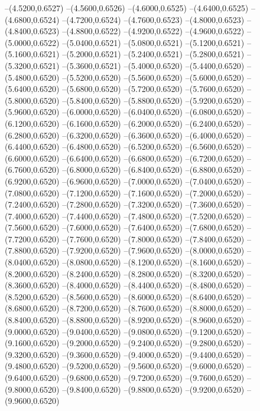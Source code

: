 {	--(4.5200,0.6527)
	--(4.5600,0.6526)
	--(4.6000,0.6525)
	--(4.6400,0.6525)
	--(4.6800,0.6524)
	--(4.7200,0.6524)
	--(4.7600,0.6523)
	--(4.8000,0.6523)
	--(4.8400,0.6523)
	--(4.8800,0.6522)
	--(4.9200,0.6522)
	--(4.9600,0.6522)
	--(5.0000,0.6522)
	--(5.0400,0.6521)
	--(5.0800,0.6521)
	--(5.1200,0.6521)
	--(5.1600,0.6521)
	--(5.2000,0.6521)
	--(5.2400,0.6521)
	--(5.2800,0.6521)
	--(5.3200,0.6521)
	--(5.3600,0.6521)
	--(5.4000,0.6520)
	--(5.4400,0.6520)
	--(5.4800,0.6520)
	--(5.5200,0.6520)
	--(5.5600,0.6520)
	--(5.6000,0.6520)
	--(5.6400,0.6520)
	--(5.6800,0.6520)
	--(5.7200,0.6520)
	--(5.7600,0.6520)
	--(5.8000,0.6520)
	--(5.8400,0.6520)
	--(5.8800,0.6520)
	--(5.9200,0.6520)
	--(5.9600,0.6520)
	--(6.0000,0.6520)
	--(6.0400,0.6520)
	--(6.0800,0.6520)
	--(6.1200,0.6520)
	--(6.1600,0.6520)
	--(6.2000,0.6520)
	--(6.2400,0.6520)
	--(6.2800,0.6520)
	--(6.3200,0.6520)
	--(6.3600,0.6520)
	--(6.4000,0.6520)
	--(6.4400,0.6520)
	--(6.4800,0.6520)
	--(6.5200,0.6520)
	--(6.5600,0.6520)
	--(6.6000,0.6520)
	--(6.6400,0.6520)
	--(6.6800,0.6520)
	--(6.7200,0.6520)
	--(6.7600,0.6520)
	--(6.8000,0.6520)
	--(6.8400,0.6520)
	--(6.8800,0.6520)
	--(6.9200,0.6520)
	--(6.9600,0.6520)
	--(7.0000,0.6520)
	--(7.0400,0.6520)
	--(7.0800,0.6520)
	--(7.1200,0.6520)
	--(7.1600,0.6520)
	--(7.2000,0.6520)
	--(7.2400,0.6520)
	--(7.2800,0.6520)
	--(7.3200,0.6520)
	--(7.3600,0.6520)
	--(7.4000,0.6520)
	--(7.4400,0.6520)
	--(7.4800,0.6520)
	--(7.5200,0.6520)
	--(7.5600,0.6520)
	--(7.6000,0.6520)
	--(7.6400,0.6520)
	--(7.6800,0.6520)
	--(7.7200,0.6520)
	--(7.7600,0.6520)
	--(7.8000,0.6520)
	--(7.8400,0.6520)
	--(7.8800,0.6520)
	--(7.9200,0.6520)
	--(7.9600,0.6520)
	--(8.0000,0.6520)
	--(8.0400,0.6520)
	--(8.0800,0.6520)
	--(8.1200,0.6520)
	--(8.1600,0.6520)
	--(8.2000,0.6520)
	--(8.2400,0.6520)
	--(8.2800,0.6520)
	--(8.3200,0.6520)
	--(8.3600,0.6520)
	--(8.4000,0.6520)
	--(8.4400,0.6520)
	--(8.4800,0.6520)
	--(8.5200,0.6520)
	--(8.5600,0.6520)
	--(8.6000,0.6520)
	--(8.6400,0.6520)
	--(8.6800,0.6520)
	--(8.7200,0.6520)
	--(8.7600,0.6520)
	--(8.8000,0.6520)
	--(8.8400,0.6520)
	--(8.8800,0.6520)
	--(8.9200,0.6520)
	--(8.9600,0.6520)
	--(9.0000,0.6520)
	--(9.0400,0.6520)
	--(9.0800,0.6520)
	--(9.1200,0.6520)
	--(9.1600,0.6520)
	--(9.2000,0.6520)
	--(9.2400,0.6520)
	--(9.2800,0.6520)
	--(9.3200,0.6520)
	--(9.3600,0.6520)
	--(9.4000,0.6520)
	--(9.4400,0.6520)
	--(9.4800,0.6520)
	--(9.5200,0.6520)
	--(9.5600,0.6520)
	--(9.6000,0.6520)
	--(9.6400,0.6520)
	--(9.6800,0.6520)
	--(9.7200,0.6520)
	--(9.7600,0.6520)
	--(9.8000,0.6520)
	--(9.8400,0.6520)
	--(9.8800,0.6520)
	--(9.9200,0.6520)
	--(9.9600,0.6520)
}
